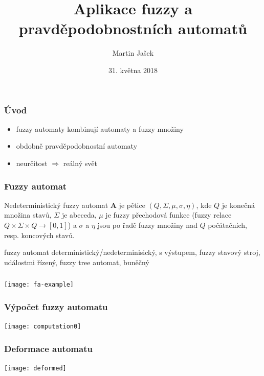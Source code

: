 \documentclass{beamer}
\title{Aplikace fuzzy a pravděpodobnostních automatů}
\author{Martin Jašek}
\date{31. května 2018}
\institute{UPOL}
\begin{document}
\begin{frame}	%
	\titlepage
\end{frame}

\begin{frame}	%
\frametitle{Úvod}
\begin{itemize}
	\item fuzzy automaty kombinují automaty a fuzzy množiny
	\item obdobně pravděpodobnostní automaty
	\item neurčitost $\Rightarrow$ reálný svět
\end{itemize}
\end{frame}

\begin{frame}	%
\frametitle{Fuzzy automat}
\vfill
\begin{definition}\label{def-ZaklDefNedFuzzAut}
 Nedeterministický fuzzy automat $\mathbf{A}$ je pětice $(Q, \Sigma, \mu, \sigma, \eta)$, kde $Q$ je konečná množina stavů, $\Sigma$ je abeceda, $\mu$ je fuzzy přechodová funkce (fuzzy relace $Q \times \Sigma \times Q \rightarrow [0, 1]$) a $\sigma$ a $\eta$ jsou po řadě fuzzy množiny nad $Q$ počátačních, resp. koncových stavů.
\end{definition}
\pause
\vfill
fuzzy automat deterministický/nedeterminisický, s výstupem, fuzzy stavový stroj, událostmi řízený, fuzzy tree automat, buněčný
\vfill
\end{frame}

\begin{frame}	%
\frametitle{}
\centering 
\texttt{[image: fa-example]}
\end{frame}

\begin{frame}	%
\frametitle{Výpočet fuzzy automatu}
\centering
\texttt{[image: computation0]}
\end{frame}

\begin{frame}	%
\frametitle{Deformace automatu}
\centering
\texttt{[image: deformed]}
\end{frame}
\end{document}
